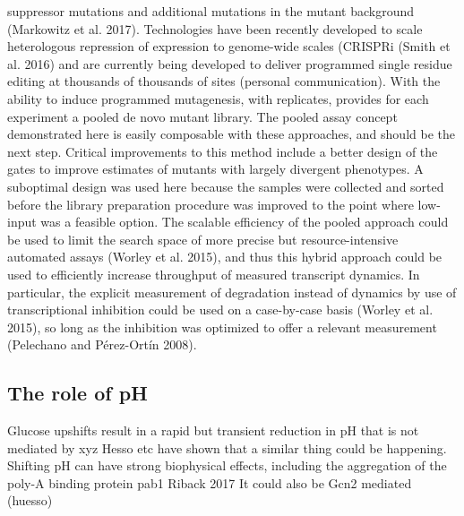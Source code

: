 suppressor mutations and additional mutations in the mutant background
(Markowitz et al. 2017). Technologies have been recently developed to
scale heterologous repression of expression to genome-wide scales
(CRISPRi (Smith et al. 2016) and are currently being developed to
deliver programmed single residue editing at thousands of thousands of
sites (personal communication). With the ability to induce programmed
mutagenesis, with  replicates, provides for each experiment a pooled
de novo mutant library. The pooled assay concept demonstrated here is
easily composable with these approaches, and should be the next step.
Critical improvements to this method include a better design of the
gates to improve estimates of mutants with largely divergent
phenotypes. A suboptimal design was used here because the samples were
collected and sorted before the library preparation procedure was
improved to the point where low-input was a feasible option.  The
scalable efficiency of the pooled approach could be used to limit the
search space of more precise but resource-intensive automated assays
(Worley et al. 2015), and thus this hybrid approach could be used to
efficiently increase throughput of measured transcript dynamics. In
particular, the explicit measurement of degradation instead of
dynamics by use of transcriptional inhibition could be used on a
case-by-case basis (Worley et al. 2015), so long as the inhibition was
optimized to offer a relevant measurement (Pelechano and Pérez-Ortín
2008).

\subsection{The role of pH}

Glucose upshifts result in a rapid but transient reduction in pH
that is not mediated by xyz
\parencite{kresnowati2008quantitative}
Hesso etc have shown that a similar thing could be happening.
Shifting pH can have strong biophysical effects, including
the aggregation of the poly-A binding protein pab1
Riback 2017
It could also be Gcn2 mediated (huesso)

